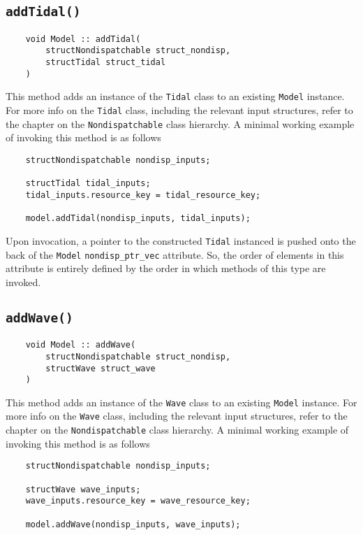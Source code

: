 \documentclass[12pt, letterpaper]{report}
\begin{document}
\subsection{\texttt{addTidal(\;\;)}}

\begin{verbatim}
    void Model :: addTidal(
        structNondispatchable struct_nondisp,
        structTidal struct_tidal
    )
\end{verbatim}

This method adds an instance of the \texttt{Tidal} class to an existing \texttt{Model} instance. For more info on the \texttt{Tidal} class, including the relevant input structures, refer to the chapter on the \texttt{Nondispatchable} class hierarchy. A minimal working example of invoking this method is as follows

\begin{verbatim}
    structNondispatchable nondisp_inputs;
    
    structTidal tidal_inputs;
    tidal_inputs.resource_key = tidal_resource_key;
    
    model.addTidal(nondisp_inputs, tidal_inputs);
\end{verbatim}

\noindent Upon invocation, a pointer to the constructed \texttt{Tidal} instanced is pushed onto the back of the \texttt{Model} \texttt{nondisp\_ptr\_vec} attribute. So, the order of elements in this attribute is entirely defined by the order in which methods of this type are invoked.

\subsection{\texttt{addWave(\;\;)}}

\begin{verbatim}
    void Model :: addWave(
        structNondispatchable struct_nondisp,
        structWave struct_wave
    )
\end{verbatim}

This method adds an instance of the \texttt{Wave} class to an existing \texttt{Model} instance. For more info on the \texttt{Wave} class, including the relevant input structures, refer to the chapter on the \texttt{Nondispatchable} class hierarchy. A minimal working example of invoking this method is as follows

\begin{verbatim}
    structNondispatchable nondisp_inputs;
    
    structWave wave_inputs;
    wave_inputs.resource_key = wave_resource_key;
    
    model.addWave(nondisp_inputs, wave_inputs);
\end{verbatim}
\end{document}
